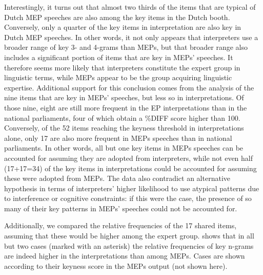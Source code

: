 \documentclass[output=paper]{langscibook}
\begin{document}
Interestingly, it turns out that almost two thirds of the items that are typical of Dutch MEP speeches are also among the key items in the Dutch booth. Conversely, only a quarter of the key items in interpretation are also key in Dutch MEP speeches. In other words, it not only appears that interpreters use a broader range of key 3- and 4-grams than MEPs, but that broader range also includes a significant portion of items that are key in MEPs’ speeches. It therefore seems more likely that interpreters constitute the expert group in linguistic terms, while MEPs appear to be the group acquiring linguistic expertise. Additional support for this conclusion comes from the analysis of the nine items that are key in MEPs’ speeches, but less so in interpretations. Of those nine, eight are still more frequent in the EP interpretations than in the national parliaments, four of which obtain a \%DIFF score higher than 100. Conversely, of the 52 items reaching the keyness threshold in interpretations alone, only 17 are also more frequent in MEPs speeches than in national parliaments. In other words, all but one key items in MEPs speeches can be accounted for assuming they are adopted from interpreters, while not even half (17+17=34) of the key items in interpretations could be accounted for assuming these were adopted from MEPs. The data also contradict an alternative hypothesis in terms of interpreters’ higher likelihood to use atypical patterns due to interference or cognitive constraints: if this were the case, the presence of so many of their key patterns in MEPs’ speeches could not be accounted for.

Additionally, we compared the relative frequencies of the 17 shared items, assuming that these would be higher among the expert group.  shows that in all but two cases (marked with an asterisk) the relative frequencies of key n-grams are indeed higher in the interpretations than among MEPs. Cases are shown according to their keyness score in the MEPs output (not shown here).
\end{document}
